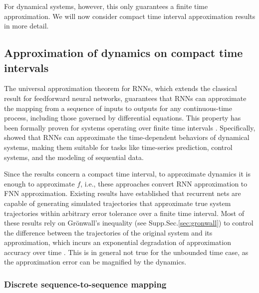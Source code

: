 \documentclass{article}
\theoremstyle{definition}
\theoremstyle{remark}
\newcounter{ct}
\begin{document}
For dynamical systems, however, this only guarantees a finite time approximation.
We will now consider compact time interval approximation results in more detail.



\subsection{Approximation of dynamics on compact time intervals}\label{sec:compacttime}
The universal approximation theorem for RNNs, which extends the classical result for feedforward neural networks, guarantees that RNNs can approximate the mapping from a sequence of inputs to outputs for any continuous-time process, including those governed by differential equations.
%
This property has been formally proven for systems operating over finite time intervals \citep{li1992approximation}. %
Specifically, \citet{funahashi1993approximation} showed that RNNs can approximate the time-dependent behaviors of dynamical systems, making them suitable for tasks like time-series prediction, control systems, and the modeling of sequential data.

Since the results concern a compact time interval, to approximate dynamics it is enough to approximate $f$, i.e., these approaches convert RNN approximation to FNN approximation.
Existing results have established that recurrent nets are capable of generating simulated trajectories that approximate true system trajectories within arbitrary error tolerance over a finite time interval.
Most of these results rely on Gr\"{o}nwall’s inequality (see Supp.Sec.\ref{sec:gronwall}) to control the difference between the trajectories of the original system and its approximation, which incurs an exponential degradation of approximation accuracy over time
\citep{sontag1992neural, sontag1998learning, funahashi1993approximation, chow2000modeling, li2005approximation}.
This is in general not true for the unbounded time case, as the approximation error can be magnified by the dynamics.




\subsubsection{Discrete sequence-to-sequence mapping}\label{sec:discrete}
\end{document}
